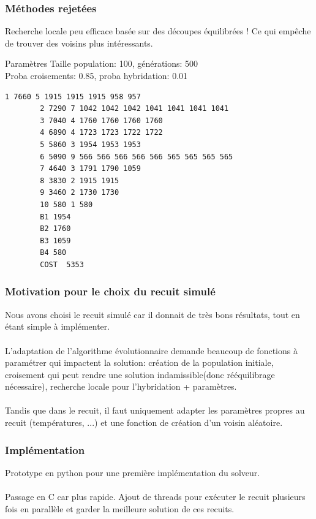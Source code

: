 \documentclass{beamer}
\begin{document}
\begin{frame}[fragile]
    \frametitle{Méthodes rejetées}
    Recherche locale peu efficace basée sur des découpes équilibrées ! Ce qui empêche de trouver des voisins plus intéressants.
    \begin{exampleblock}{Paramètres}
        Taille population: 100, générations: 500\\
        Proba croisements: 0.85, proba hybridation: 0.01
    \begin{lstlisting}[basicstyle=\tiny]
        1 7660 5 1915 1915 1915 958 957
        2 7290 7 1042 1042 1042 1041 1041 1041 1041
        3 7040 4 1760 1760 1760 1760
        4 6890 4 1723 1723 1722 1722
        5 5860 3 1954 1953 1953
        6 5090 9 566 566 566 566 566 565 565 565 565
        7 4640 3 1791 1790 1059
        8 3830 2 1915 1915
        9 3460 2 1730 1730
        10 580 1 580
        B1 1954
        B2 1760
        B3 1059
        B4 580
        COST  5353
    \end{lstlisting}
    \end{exampleblock}
\end{frame}

\begin{frame}
    \frametitle{Motivation pour le choix du recuit simulé}
    Nous avons choisi le recuit simulé car il donnait de très bons résultats, tout en étant simple à implémenter.\\~\\

    L'adaptation de l'algorithme évolutionnaire demande beaucoup de fonctions à paramétrer qui impactent la solution: création de la population initiale, croisement qui peut rendre une solution indamissible(donc rééquilibrage nécessaire), recherche locale pour l'hybridation + paramètres.\\~\\

    Tandis que dans le recuit, il faut uniquement adapter les paramètres propres au recuit (températures, ...) et une fonction de création d'un voisin aléatoire.
\end{frame}

\begin{frame}
    \frametitle{Implémentation}
    Prototype en python pour une première implémentation du solveur.\\~\\

    Passage en C car plus rapide. Ajout de threads pour exécuter le recuit plusieurs fois en parallèle et garder la meilleure solution de ces recuits.

\end{frame}
\end{document}
